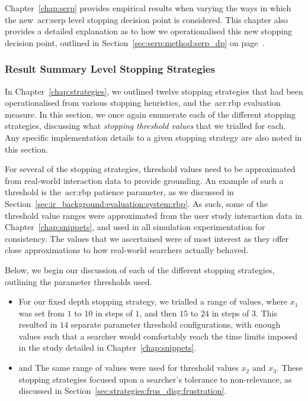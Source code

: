 Chapter~\ref{chap:serp} provides empirical results when varying the ways in which the new~\gls{acr:serp} level stopping decision point is considered. This chapter also provides a detailed explanation as to how we operationalised this new stopping decision point, outlined in Section~\ref{sec:serp:method:serp_dp} on page~\pageref{sec:serp:method:serp_dp}.

\subsubsection{Result Summary Level Stopping Strategies}\label{sec:method:simulation:grounding:stopping}
In Chapter~\ref{chap:strategies}, we outlined twelve stopping strategies that had been operationalised from various stopping heuristics, and the~\gls{acr:rbp} evaluation measure. In this section, we once again enumerate each of the different stopping strategies, discussing what \emph{stopping threshold values} that we trialled for each. Any specific implementation details to a given stopping strategy are also noted in this section.

For several of the stopping strategies, threshold values need to be approximated from real-world interaction data to provide grounding. An example of such a threshold is the~\gls{acr:rbp} patience parameter, as we discussed in Section~\ref{sec:ir_background:evaluation:system:rbp}. As such, some of the threshold value ranges were approximated from the user study interaction data in Chapter~\ref{chap:snippets}, and used in all simulation experimentation for consistency. The values that we ascertained were of most interest as they offer close approximations to how real-world searchers actually behaved.

Below, we begin our discussion of each of the different stopping strategies, outlining the parameter thresholds used.

\begin{itemize}
    \item{ For our fixed depth stopping strategy, we trialled a range of values, where $x_1$ was set from $1$ to $10$ in steps of $1$, and then $15$ to $24$ in steps of $3$. This resulted in $14$ separate parameter threshold configurations, with enough values such that a searcher would comfortably reach the time limits imposed in the study detailed in Chapter~\ref{chap:snippets}.}
    
    \item{ and  The same range of values were used for threshold values $x_2$ and $x_3$. These stopping strategies focused upon a searcher's tolerance to non-relevance, as discussed in Section~\ref{sec:strategies:frus_disg:frustration}.}
\end{itemize}

